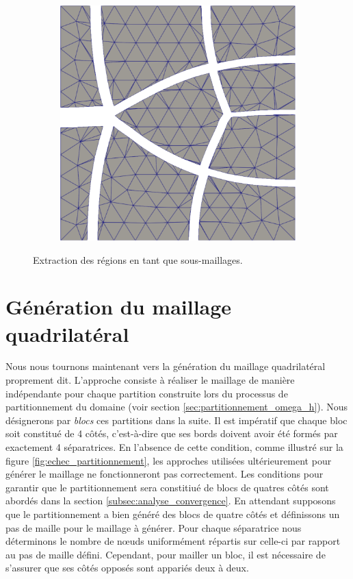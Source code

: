 \begin{figure}[h!]
\begin{subfigure}{0.49\textwidth}
    \includegraphics[width=\textwidth]{images/eclatement_3.pdf}
\end{subfigure}
\caption{Extraction des régions en tant que sous-maillages.}
\label{fig:eclatement}
\end{figure}


\section{Génération du maillage quadrilatéral}
\label{sec:gen_mesh_quad}

Nous nous tournons maintenant vers la génération du maillage quadrilatéral proprement dit. L'approche consiste à réaliser le maillage de manière indépendante pour chaque partition construite lors du processus de partitionnement du domaine (voir section \ref{sec:partitionnement_omega_h}). Nous désignerons par \emph{blocs} ces partitions dans la suite. Il est impératif que chaque bloc soit constitué de 4 côtés, c'est-à-dire que ses bords doivent avoir été formés par exactement 4 séparatrices. En l'absence de cette condition, comme illustré sur la figure \ref{fig:echec_partitionnement}, les approches utilisées ultérieurement pour générer le maillage ne fonctionneront pas correctement. Les conditions pour garantir que le partitionnement sera constitiué de blocs de quatres côtés sont abordés dans la section \ref{subsec:analyse_convergence}. En attendant supposons que le partitionnement a bien généré des blocs de quatre côtés et définissons un pas de maille pour le maillage à générer. Pour chaque séparatrice nous déterminons le nombre de nœuds uniformément répartis sur celle-ci par rapport au pas de maille défini. Cependant, pour mailler un bloc, il est nécessaire de s'assurer que ses côtés opposés sont appariés deux à deux.

